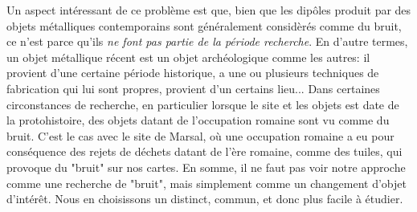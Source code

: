 \documentclass[a4paper, 12pt, titlepage, oneside, french]{article}
\begin{document}
	Un aspect intéressant de ce problème est que, bien que les dipôles produit par des objets métalliques contemporains sont généralement considèrés comme du bruit, ce n'est parce qu'ils \textit{ne font pas partie de la période recherche}. En d'autre termes, un objet métallique récent est un objet archéologique comme les autres: il provient d'une certaine période historique, a une ou plusieurs techniques de fabrication qui lui sont propres, provient d'un certains lieu... Dans certaines circonstances de recherche, en particulier lorsque le site et les objets est date de la protohistoire, des objets datant de l'occupation romaine sont vu comme du bruit. C'est le cas avec le site de Marsal, où une occupation romaine a eu pour conséquence des rejets de déchets datant de l'ère romaine, comme des tuiles, qui provoque du "bruit" sur nos cartes. En somme, il ne faut pas voir notre approche comme une recherche de "bruit", mais simplement comme un changement d'objet d'intérêt. Nous en choisissons un distinct, commun, et donc plus facile à étudier.
\end{document}
